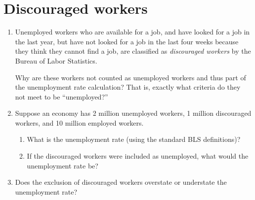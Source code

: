 \documentclass{assignment}
\begin{document}
\clearpage

\section{Discouraged workers}

\begin{enumerate}

\item Unemployed workers who are available for a job, and have looked for a job in the last year, but have not looked for a job in the last four weeks because they think they cannot find a job, are classified as \emph{discouraged workers} by the Bureau of Labor Statistics.

Why are these workers not counted as unemployed workers and thus part of the unemployment rate calculation? That is, exactly what criteria do they not meet to be ``unemployed?''

\vfill
\vfill

\item Suppose an economy has 2 million unemployed workers, 1 million discouraged workers, and 10 million employed workers.

\begin{enumerate}

\item What is the unemployment rate (using the standard BLS definitions)?

\vfill

\item If the discouraged workers were included as unemployed, what would the unemployment rate be?

\vfill

\end{enumerate}

\item Does the exclusion of discouraged workers overstate or understate the unemployment rate? 

\vfill
\vfill

\end{enumerate}
\end{document}
